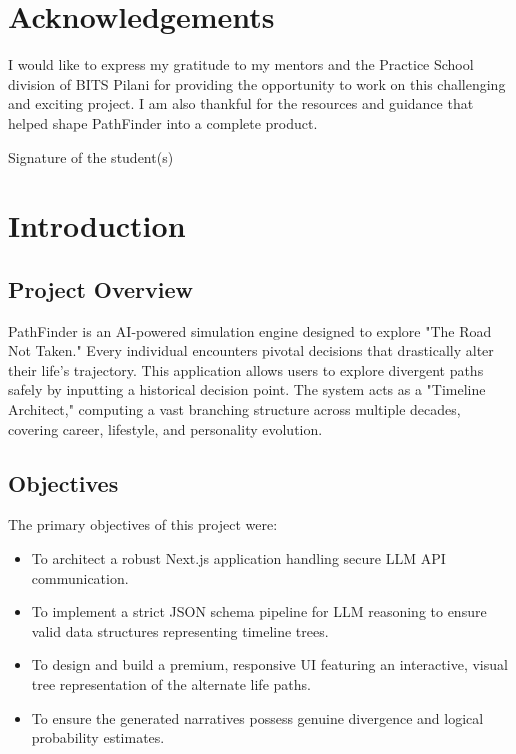 \documentclass[12pt,a4paper]{report}
\begin{document}
\chapter*{Acknowledgements}
\par\noindent
I would like to express my gratitude to my mentors and the Practice School division of BITS Pilani for providing the opportunity to work on this challenging and exciting project. I am also thankful for the resources and guidance that helped shape PathFinder into a complete product.
\vspace{2cm}

\noindent
Signature of the student(s)

\tableofcontents
\listoffigures
\listoftables

\chapter{Introduction}
\section{Project Overview}
PathFinder is an AI-powered simulation engine designed to explore "The Road Not Taken." Every individual encounters pivotal decisions that drastically alter their life's trajectory. This application allows users to explore divergent paths safely by inputting a historical decision point. The system acts as a "Timeline Architect," computing a vast branching structure across multiple decades, covering career, lifestyle, and personality evolution.

\section{Objectives}
The primary objectives of this project were:
\begin{itemize}
    \item To architect a robust Next.js application handling secure LLM API communication.
    \item To implement a strict JSON schema pipeline for LLM reasoning to ensure valid data structures representing timeline trees.
    \item To design and build a premium, responsive UI featuring an interactive, visual tree representation of the alternate life paths.
    \item To ensure the generated narratives possess genuine divergence and logical probability estimates.
\end{itemize}
\end{document}

